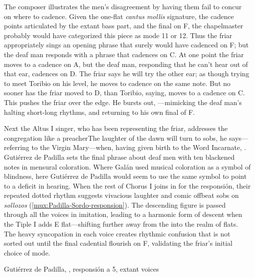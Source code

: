 The composer illustrates the men's disagreement by having them fail to concur on
where to cadence.
Given the one-flat \emph{cantus mollis} signature, the cadence points
articulated by the extant bass part, and the final on F, the chapelmaster
probably would have categorized this piece as mode 11 or 12.%
    \Autocites
    [873--882]{Cerone:Melopeo} 
    {Judd:RenaissanceModalTheory}
    {Barnett:TonalOrganization17C}  
Thus the friar appropriately sings an opening phrase that surely would have
cadenced on F; but the deaf man responds with a phrase that cadences on C.
At one point the friar moves to a cadence on A, but the deaf man, responding
that he can't hear out of that ear, cadences on D. 
The friar says he will try the other ear; as though trying to meet Toribio on
his level, he moves to cadence on the same note.
But no sooner has the friar moved to D, than Toribio, saying,  moves to a cadence on C.  
This pushes the friar over the edge.
He bursts out, ---mimicking the deaf man's
halting short-long rhythms, and returning to his own final of F.

Next the Altus I singer, who has been representing the friar, addresses the
congregation like a preacher{The laughter of the dawn will turn to
sobs}, he says---referring to the Virgin Mary---when, having given birth to the
Word Incarnate, .  
Gutiérrez de Padilla sets the final phrase about deaf men with ten blackened
notes in mensural coloration.
Where Galán used musical coloration as a symbol of blindness, here Gutiérrez de
Padilla would seem to use the same symbol to point to a deficit in hearing.
When the rest of Chorus I joins in for the responsión, their repeated dotted
rhythm suggests vivacious laughter and comic offbeat sobs on \emph{sollozos}
(\cref{mux:Padilla-Sordo-responsion}).
The descending figure is passed through all the voices in imitation, leading to
a harmonic form of descent when the Tiple I adds E flat---shifting further away
from the  into the  realm of flats.
The heavy syncopation in each voice creates rhythmic confusion that is not
sorted out until the final cadential flourish on F, validating the friar's
initial choice of mode.

{Gutiérrez de Padilla, , responsión a 5,
extant voices}

